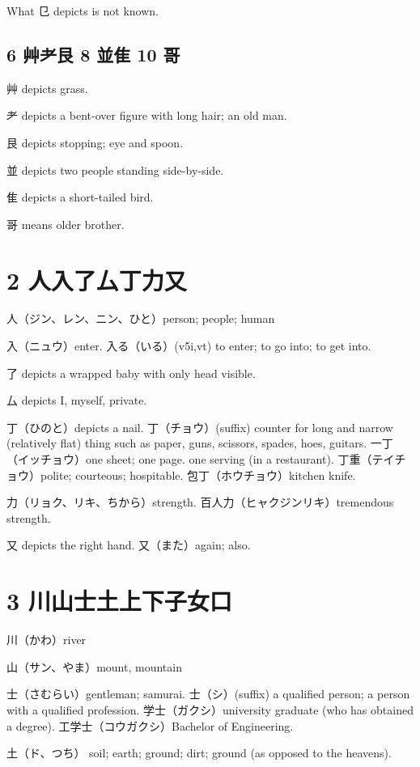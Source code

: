 What 㔾 depicts is not known.

\subsection{6 艸耂艮 8 並隹 10 哥}

艸 depicts grass.

耂 depicts a bent-over figure with long hair; an old man.

艮 depicts stopping; eye and spoon.

並 depicts two people standing side-by-side.

隹 depicts a short-tailed bird.

哥 means older brother.

\section{2 人入了厶丁力又}

人（ジン、レン、ニン、ひと）person; people; human

入（ニュウ）enter.
入る（いる）(v5i,vt)
to enter; to go into; to get into.

了 depicts a wrapped baby with only head visible.

厶 depicts I, myself, private.

丁（ひのと）depicts a nail.
丁（チョウ）(suffix)
counter for long and narrow (relatively flat) thing
such as paper, guns, scissors, spades, hoes, guitars.
一丁（イッチョウ）one sheet; one page.
one serving (in a restaurant).
丁重（テイチョウ）polite; courteous; hospitable.
包丁（ホウチョウ）kitchen knife.

力（リョク、リキ、ちから）strength.
百人力（ヒャクジンリキ）tremendous strength.

又 depicts the right hand.
又（また）again; also.

\section{3 川山士土上下子女口}

川（かわ）river

山（サン、やま）mount, mountain

士（さむらい）gentleman; samurai.
士（シ）(suffix)
a qualified person;
a person with a qualified profession.
学士（ガクシ）university graduate (who has obtained a degree).
工学士（コウガクシ）Bachelor of Engineering.

土（ド、つち）
soil; earth; ground; dirt; ground (as opposed to the heavens).

